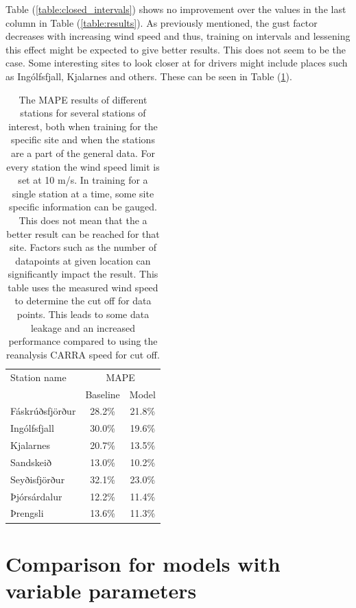 Table (\ref{table:closed_intervals}) shows no improvement over the values in the last column in Table (\ref{table:results}). As previously mentioned, the gust factor decreases with increasing wind speed and thus, training on intervals and lessening this effect might be expected to give better results. This does not seem to be the case. Some interesting sites to look closer at for drivers might include places such as Ingólfsfjall, Kjalarnes and others. These can be seen in Table (\ref{table:more_specific_sites}).

\begin{table}[h]
    \caption[Model result by stations of interest]{The MAPE results of different stations for several stations of interest, both when training for the specific site and when the stations are a part of the general data. For every station the wind speed limit is set at 10 m/s. In training for a single station at a time, some site specific information can be gauged. This does not mean that the a better result can be reached for that site. Factors such as the number of datapoints at given location can significantly impact the result. This table uses the measured wind speed to determine the cut off for data points. This leads to some data leakage and an increased performance compared to using the reanalysis CARRA speed for cut off.}
    \label{table:more_specific_sites}
    \centering
    \begin{tabular}{lcc}
        \toprule
        Station name & \multicolumn{2}{c}{MAPE}\\
         & Baseline & Model\\
        \midrule
        Fáskrúðsfjörður & 28.2\% & 21.8\%\\
        Ingólfsfjall & 30.0\% & 19.6\%\\
        Kjalarnes & 20.7\% & 13.5\% \\
        Sandskeið & 13.0\% & 10.2\%\\
        Seyðisfjörður & 32.1\% & 23.0\%\\
        Þjórsárdalur & 12.2\% & 11.4\%\\
        Þrengsli & 13.6\% & 11.3\%\\
        \bottomrule
    \end{tabular}
\end{table}

\section{Comparison for models with variable parameters}

